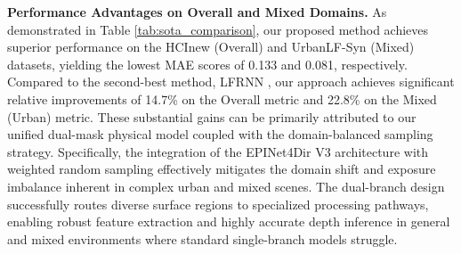 \documentclass[lettersize,journal]{IEEEtran}
\begin{document}
\begin{table}[!t]
\centering
\caption{Quantitative Comparison with State-of-the-Art Methods on Light Field Depth Estimation (MAE $\downarrow$). The best results are highlighted in \textbf{bold}, and the second-best results are \underline{underlined}.}
\label{tab:sota_comparison}
\renewcommand{\arraystretch}{1.3}
\end{table}

\textbf{Performance Advantages on Overall and Mixed Domains.} 
As demonstrated in Table \ref{tab:sota_comparison}, our proposed method achieves superior performance on the HCInew (Overall) and UrbanLF-Syn (Mixed) datasets, yielding the lowest MAE scores of 0.133 and 0.081, respectively. Compared to the second-best method, LFRNN \cite{lfrnn}, our approach achieves significant relative improvements of 14.7\% on the Overall metric and 22.8\% on the Mixed (Urban) metric. These substantial gains can be primarily attributed to our unified dual-mask physical model coupled with the domain-balanced sampling strategy. Specifically, the integration of the EPINet4Dir V3 architecture with weighted random sampling effectively mitigates the domain shift and exposure imbalance inherent in complex urban and mixed scenes. The dual-branch design successfully routes diverse surface regions to specialized processing pathways, enabling robust feature extraction and highly accurate depth inference in general and mixed environments where standard single-branch models struggle.
\end{document}
